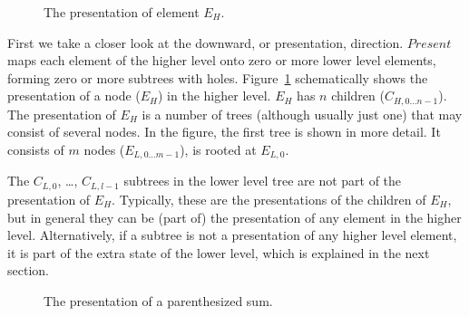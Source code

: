 \begin{figure}
\begin{center}
\begin{center}
%                    
\end{center}
\caption{The presentation of element $E_H$.}\label{elementPresentation} 
\end{center}
\end{figure}

First we take a closer look at the downward, or presentation, direction. $Present$ maps each element of the higher level onto zero or more lower level elements, forming zero or more subtrees with holes.  Figure~\ref{elementPresentation} schematically shows the presentation of a node ($E_H$) in the higher level. $E_H$ has $n$ children ($C_{H,0\dots n-1}$). The presentation of $E_H$ is a number of trees (although usually just one) that may consist of several nodes. In the figure, the first tree is shown in more detail. It consists of $m$ nodes ($E_{L,0\dots m-1}$), is rooted at $E_{L,0}$. 

The $C_{L,0}$, \dots, $C_{L,l-1}$ subtrees in the lower level tree are not part of the presentation of $E_H$. Typically, these are the presentations of the children of $E_H$, but in general they can be (part of) the presentation of any element in the higher level. Alternatively, if a subtree is not a presentation of any higher level element, it is part of the extra state of the lower level, which is explained in the next section.

\begin{figure}
\begin{center}
\begin{center}
%
%
\end{center}
\caption{The presentation of a parenthesized sum.}\label{presentExample} 
\end{center}
\end{figure}

